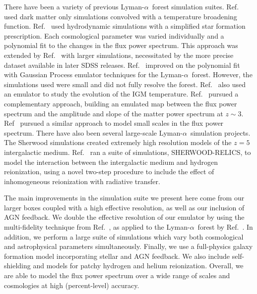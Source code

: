 \documentclass[a4paper,11pt]{article}
\newcommand{\Lya}{Lyman-$\alpha$}
\begin{document}
There have been a variety of previous \Lya~forest simulation suites. Ref.~\cite{McDonald:2005pk} used dark matter only simulations convolved with a temperature broadening function. Ref.~\cite{Viel:2006} used hydrodynamic simulations with a simplified star formation prescription. Each cosmological parameter was varied individually and a polynomial fit to the changes in the flux power spectrum. This approach was extended by Ref.~\cite{Borde:2014, Rossi:2020} with larger simulations, necessitated by the more precise dataset available in later SDSS releases. Ref.~\cite{Bird:2019} improved on the polynomial fit with Gaussian Process emulator techniques for the \Lya~forest. However, the simulations used were small and did not fully resolve the forest. Ref.~\cite{Walther:2019} also used an emulator to study the evolution of the IGM temperature. Ref.~\cite{Pedersen:2021, Pedersen:2022} pursued a complementary approach, building an emulated map between the flux power spectrum and the amplitude and slope of the matter power spectrum at $z\sim 3$. Ref~\cite{Esposito:2022} pursued a similar approach to model small scales in the flux power spectrum. There have also been several large-scale \Lya~simulation projects. The Sherwood simulations \cite{Bolton:2017} created extremely high resolution models of the $z=5$ intergalactic medium. Ref.~\cite{Puchwein:2022} ran a suite of simulations, SHERWOOD-RELICS, to model the interaction between the intergalactic medium and hydrogen reionization, using a novel two-step procedure to include the effect of inhomogeneous reionization with radiative transfer.

The main improvements in the simulation suite we present here come from our larger boxes coupled with a high effective resolution, as well as our inclusion of AGN feedback. We double the effective resolution of our emulator by using the multi-fidelity technique from Ref.~\cite{Ho:2022}, as applied to the \Lya~forest by Ref.~\cite{Fernandez:2022}. In addition, we perform a large suite of simulations which vary both cosmological and astrophysical parameters simultaneously. Finally, we use a full-physics galaxy formation model incorporating stellar and AGN feedback. We also include self-shielding and models for patchy hydrogen and helium reionization. Overall, we are able to model the flux power spectrum over a wide range of scales and cosmologies at high (percent-level) accuracy.
\end{document}
